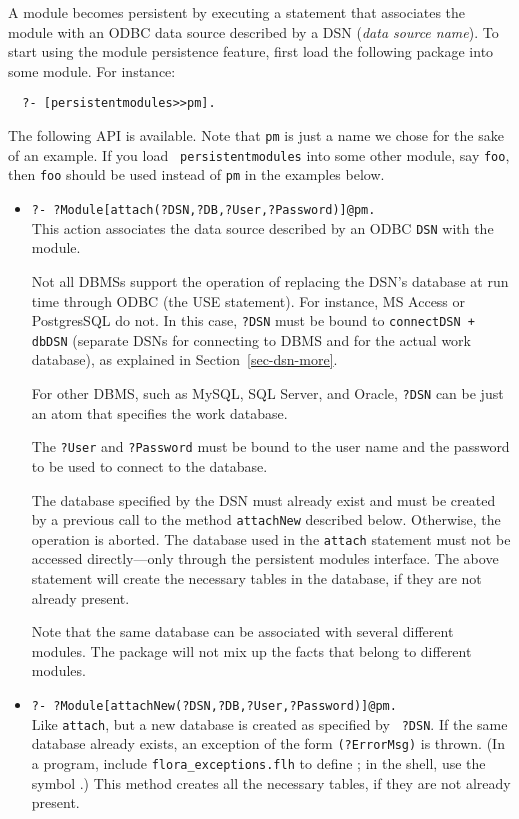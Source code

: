 A module becomes persistent by executing a statement that associates the
module with an ODBC data source described by a DSN (\emph{data source
  name}).
To start using the module persistence
feature, first load the following package into some module. For instance:
\begin{verbatim}
  ?- [persistentmodules>>pm].
\end{verbatim}
The following API is available. Note that \texttt{pm} is just a name we
chose for the sake of an example. If you load {\tt
  persistentmodules} into some other module, say {\tt foo}, then {\tt foo}
should be used instead of {\tt pm} in the examples below.    
\begin{itemize}
\item {\tt ?- ?Module[attach(?DSN,?DB,?User,?Password)]@pm.}\\
  This action associates the data source described by an ODBC {\tt DSN}
  with the module.  

  Not all DBMSs support the operation of replacing the
  DSN's database at run time through ODBC (the USE statement).
  For instance, MS Access or PostgresSQL do not.
  In this case, \texttt{?DSN} must be bound to \texttt{connectDSN + dbDSN}
  (separate DSNs for connecting to DBMS and for the actual work database),
  as explained in Section~\ref{sec-dsn-more}.

  For other DBMS, such as MySQL, SQL Server, and Oracle, {\tt ?DSN} can be
  just an atom that specifies the work database. 

  The {\tt ?User} and {\tt ?Password} must be bound to the user name and
  the password to be used to connect to the database.

  The database specified by the DSN must already exist and must be created
  by a previous call to the method \texttt{attachNew} described below.
  Otherwise, the operation is aborted.
  The database used in the {\tt attach}
  statement must not be accessed directly---only through the persistent
  modules interface.  The above statement will create the necessary tables
  in the database, if they are not already present.

  Note that the same database can be associated with several different
  modules. The package will not mix up the facts that belong to different
  modules.
\item {\tt ?- ?Module[attachNew(?DSN,?DB,?User,?Password)]@pm.}\\
  Like {\tt attach}, but a new database is created as specified by {\tt
    ?DSN}.  If the same database already exists, an exception of the form
  {\tt \FLDBEXCEPTION(?ErrorMsg)} is thrown.  (In a program, include
  {\tt flora\_exceptions.flh} to define {\tt \FLDBEXCEPTION}; in the
  shell, use the symbol {\tt \fldbexception}.)  This method creates
  all the necessary tables, if they are not already present.


\end{itemize}
